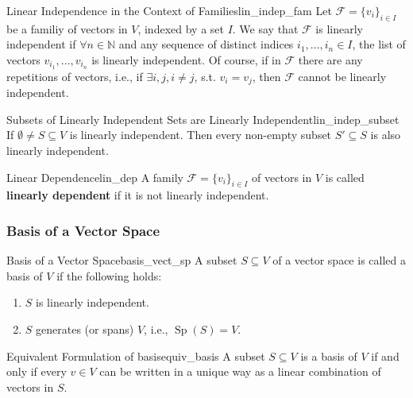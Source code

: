 \begin{definition}{Linear Independence in the Context of Families}{lin_indep_fam}
	Let $\mathcal{F} = \{v_i\}_{i \in I}$ be a familiy of vectors in $V$, indexed by a set $I$. We say that $\mathcal{F}$ is linearly independent if $\forall n \in \mathbb{N}$ and any sequence of distinct indices $i_1, \hdots , i_n \in I$, the list of vectors $v_{i_1}, \hdots , v_{i_n}$ is linearly independent.
	Of course, if in $\mathcal{F}$ there are any repetitions of vectors, i.e., if $\exists i,j, i\neq j$, s.t. $v_i = v_j$, then $\mathcal{F}$ cannot be linearly independent.
\end{definition}

\begin{lemma}{Subsets of Linearly Independent Sets are Linearly Independent}{lin_indep_subset}
	If $\emptyset \neq S \subseteq V$ is linearly independent. Then every non-empty subset $S' \subseteq S$ is also linearly independent.
\end{lemma}

\begin{definition}{Linear Dependence}{lin_dep}
	A family $\mathcal{F} = \{v_i\}_{i \in I}$ of vectors in $V$ is called \textbf{linearly dependent} if it is not linearly independent.
\end{definition}

\subsubsection{Basis of a Vector Space}

\begin{definition}{Basis of a Vector Space}{basis_vect_sp}
	A subset $S \subseteq V$ of a vector space is called a basis of $V$ if the following holds:
	\begin{enumerate}
		\item[(1)] $S$ is linearly independent.
		\item[(2)] $S$ generates (or spans) $V$, i.e., $\operatorname{Sp}(S) = V$.
	\end{enumerate}
\end{definition}

\begin{proposition}{Equivalent Formulation of basis}{equiv_basis}
	A subset $S \subseteq V$ is a basis of $V$ if and only if every $v \in V$ can be written in a unique way as a linear combination of vectors in $S$.
\end{proposition}


